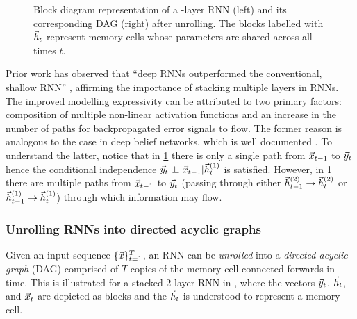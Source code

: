 \begin{figure}[tb]
    \centering
    \resizebox{4.5in}{!}{}
    \caption{Block diagram representation of a -layer RNN (left) and its
    corresponding DAG (right) after unrolling. The blocks labelled
    with $\vec{h}_t$ represent memory cells whose parameters are shared across all times
  $t$.}
    \label{fig:rnn-multi-unrolled}
\end{figure}

Prior work has observed that ``deep RNNs outperformed the conventional, shallow RNN''
\citet{pascanu2013construct}, affirming the importance of stacking multiple layers
in RNNs. The improved modelling expressivity can be attributed to two primary
factors: composition of multiple non-linear activation functions and an
increase in the number of paths for backpropagated error signals to flow. The
former reason is analogous to the case in deep belief networks, which is well
documented \citep{bengio2009learning}. To understand the latter, notice that in
\cref{fig:rnn-multi-unrolled} there is only a single path from $\vec{x}_{t-1}$ to
$\vec{y}_{t}$ hence the conditional independence $\y_{t} \independent \x_{t-1} |
\h^{(1)}_t$ is satisfied. However, in \cref{fig:rnn-multi-unrolled} there are
multiple paths from $\vec{x}_{t-1}$ to $\vec{y}_{t}$ (\eg passing through either
$\vec{h}^{(2)}_{t-1} \to \vec{h}^{(2)}_t$ or $\vec{h}^{(1)}_{t-1} \to \vec{h}^{(1)}_t$) through
which information may flow.

\subsubsection{Unrolling RNNs into directed acyclic graphs}


Given an input sequence $\{\vec{x}\}_{t=1}^T$, an RNN can be \emph{unrolled} into a
\emph{directed acyclic graph} (DAG) comprised of $T$ copies of the memory cell
connected forwards in time. This is illustrated for a stacked 2-layer RNN in
, where the vectors $\vec{y}_t$, $\vec{h}_t$, and $\vec{x}_t$ are
depicted as blocks and the $\vec{h}_t$ is understood to represent a memory cell.


